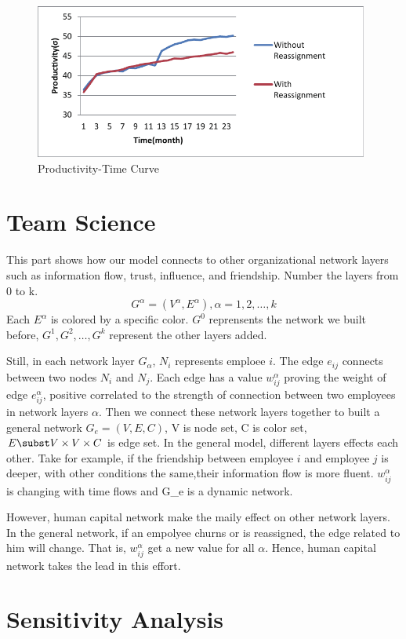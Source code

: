 \documentclass[12pt,a4paper,titlepage]{article}
\begin{document}
\begin{figure}[htb]
  \centering
  \includegraphics[width=11cm]{p3.pdf}
  \caption{Productivity-Time Curve}\label{reassign}
\end{figure}

\section{Team Science}
\label{sec:team-science}

This part shows how our model connects to other organizational network
layers such as information flow, trust, influence, and
friendship. Number the layers from 0 to
k. $$G^\alpha=(V^\alpha,E^\alpha), \alpha=1,2,\ldots,k$$ Each
$E^\alpha$ is colored by a specific color. $G^0$ reprensents the
network we built before, $G^1, G^2, \ldots ,G^k$ represent the other layers added.

Still, in each network layer $G_\alpha$, $N_i$ represents emploee
$i$. The edge $e_{ij}$ connects between two nodes $N_i$ and
$N_j$. Each edge has a value $w_{ij}^\alpha$ proving the weight of
edge $e_{ij}^\alpha$, positive correlated to the strength of
connection between two employees in network layers $\alpha$. Then we
connect these network layers together to built a general network
$G_e=(V, E, C)$, V is node set, C is color set, $E\subst V\times
V\times C$ is edge set. In the general model, different layers effects
each other. Take for example, if the friendship between employee $i$
and employee $j$ is deeper, with other conditions the same,their
information flow is more fluent. $w_{ij}^\alpha$ is changing with time
flows and G_e is a dynamic network.

However, human capital network make the maily effect on other network
layers. In the general network, if an empolyee churns or is
reassigned, the edge related to him will change. That is,
$w_{ij}^\alpha$ get a new value for all $\alpha$. Hence, human capital
network takes the lead in this effort.

\section{Sensitivity Analysis}
\label{sec:sensitivity-analysis}
\end{document}
